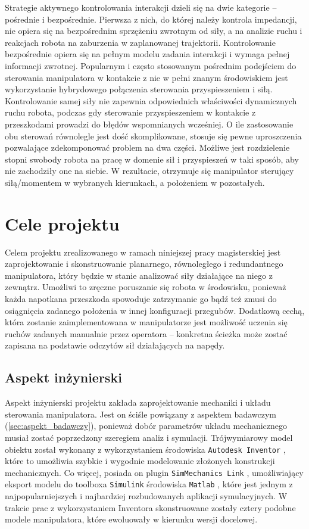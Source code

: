 \documentclass[printmode]{mgr}
\begin{document}
Strategie aktywnego kontrolowania interakcji dzieli się na dwie kategorie -- pośrednie i bezpośrednie.
Pierwsza z nich, do której należy kontrola impedancji, nie opiera się na bezpośrednim sprzężeniu zwrotnym od siły, a na analizie ruchu
i reakcjach robota na zaburzenia w zaplanowanej trajektorii. Kontrolowanie bezpośrednie opiera się na pełnym modelu zadania interakcji
i wymaga pełnej informacji zwrotnej. Popularnym i często stosowanym pośrednim podejściem do sterowania manipulatora w kontakcie z nie w 
pełni znanym środowiskiem jest wykorzystanie hybrydowego połączenia sterowania przyspieszeniem i siłą. 
Kontrolowanie samej siły nie zapewnia odpowiednich właściwości dynamicznych ruchu
robota, podczas gdy sterowanie przyspieszeniem w kontakcie z przeszkodami prowadzi do błędów wspomnianych wcześniej. 
O ile zastosowanie obu sterowań równolegle jest dość skomplikowane, stosuje się pewne uproszczenia pozwalające zdekomponować
problem na dwa części. Możliwe jest rozdzielenie stopni swobody robota na pracę w domenie sił i przyspieszeń w taki sposób,
aby nie zachodziły one na siebie. W rezultacie, otrzymuje się manipulator sterujący siłą/momentem w wybranych kierunkach,
a położeniem w pozostałych.


\chapter{Cele projektu} \label{ch:cele}
Celem projektu zrealizowanego w ramach niniejszej pracy magisterskiej jest zaprojektowanie i skonstruowanie planarnego, równoległego
i redundantnego manipulatora, który będzie w stanie analizować siły działające na niego z zewnątrz. Umożliwi to 
zręczne poruszanie się robota w środowisku, ponieważ każda napotkana przeszkoda spowoduje zatrzymanie go bądź też zmusi
do osiągnięcia zadanego położenia w innej konfiguracji przegubów. Dodatkową cechą, która zostanie zaimplementowana w manipulatorze
jest możliwość uczenia się ruchów zadanych manualnie przez operatora -- konkretna ścieżka może zostać zapisana na podstawie
odczytów sił działających na napędy. 

\section{Aspekt inżynierski}
Aspekt inżynierski projektu zakłada zaprojektowanie mechaniki i układu sterowania manipulatora. Jest on ściśle powiązany
z aspektem badawczym (\ref{sec:aspekt_badawczy}), ponieważ dobór parametrów układu mechanicznego musiał zostać poprzedzony
szeregiem analiz i symulacji. Trójwymiarowy model obiektu został wykonany z wykorzystaniem środowiska \texttt{Autodesk Inventor} \cite{autodesk},
które to umożliwia szybkie i wygodnie modelowanie złożonych konstrukcji mechanicznych. Co więcej, posiada on plugin
\texttt{SimMechanics Link} \cite{simmechanics_link}, umożliwiający eksport modelu do toolboxa \texttt{Simulink} środowiska 
\texttt{Matlab} \cite{mathworks}, które jest jednym z najpopularniejszych i najbardziej rozbudowanych aplikacji symulacyjnych.
W trakcie prac z wykorzystaniem Inventora skonstruowane zostały cztery podobne modele manipulatora, które ewoluowały 
w kierunku wersji docelowej. 
\end{document}
